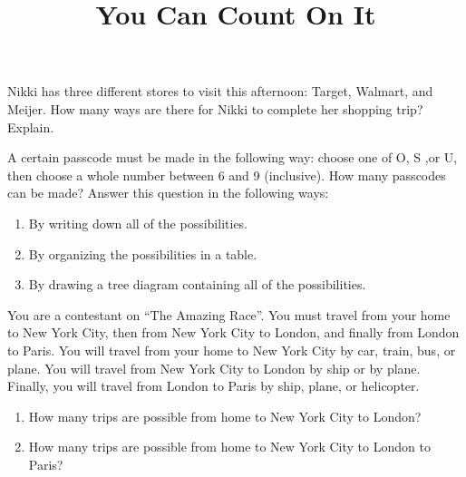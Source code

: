 \documentclass[nooutcomes,noauthor]{ximera}
\title{You Can Count On It}
\begin{document}
\begin{abstract}
\end{abstract}
\maketitle



\begin{problem}
Nikki has three different stores to visit this afternoon: Target, Walmart, and Meijer.  How many ways are there for Nikki to complete her shopping trip?  Explain.
\end{problem}





\begin{problem}
A certain passcode must be made in the following way: choose one of O, S ,or U, then choose a whole number between 6 and 9 (inclusive).  How many passcodes can be made?  Answer this question in the following ways:
\begin{enumerate}
\item By writing down all of the possibilities.
\item By organizing the possibilities in a table.
\item By drawing a tree diagram containing all of the possibilities.
\end{enumerate}
\end{problem}

\begin{problem}
You are a contestant on ``The Amazing Race''.  You must travel from your home to New York City, then from New York City to London, and finally from London to Paris.  You will travel from your home to New York City by car, train, bus, or plane.  You will travel from New York City to London by ship or by plane.  Finally, you will travel from London to Paris by ship, plane, or helicopter.
\begin{enumerate}
\item How many trips are possible from home to New York City to London?
\item How many trips are possible from home to New York City to London to Paris?
\end{enumerate}
\end{problem}
\end{document}
